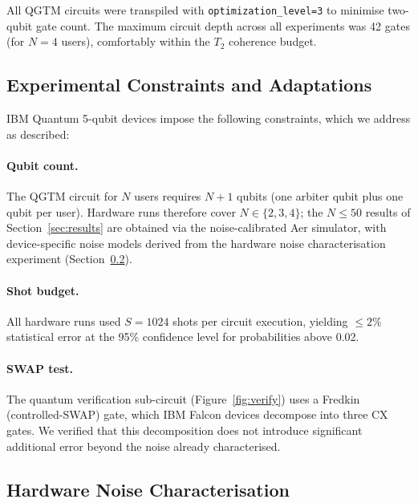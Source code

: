 \noindent All QGTM circuits were transpiled with \texttt{optimization\_level=3} to
minimise two-qubit gate count. The maximum circuit depth across all experiments
was 42 gates (for $N=4$ users), comfortably within the $T_2$ coherence budget.

\subsection{Experimental Constraints and Adaptations}
\label{subsec:hw_constraints}

IBM Quantum 5-qubit devices impose the following constraints, which we address
as described:

\paragraph{Qubit count.}
The QGTM circuit for $N$ users requires $N+1$ qubits (one arbiter qubit plus
one qubit per user). Hardware runs therefore cover $N \in \{2, 3, 4\}$; the
$N \leq 50$ results of Section~\ref{sec:results} are obtained via the
noise-calibrated Aer simulator, with device-specific noise models derived from
the hardware noise characterisation experiment (Section~\ref{subsec:hw_noise}).

\paragraph{Shot budget.}
All hardware runs used $S = 1024$ shots per circuit execution, yielding
$\le 2\%$ statistical error at the 95\% confidence level for probabilities
above 0.02.

\paragraph{SWAP test.}
The quantum verification sub-circuit (Figure~\ref{fig:verify}) uses a
Fredkin (controlled-SWAP) gate, which IBM Falcon devices decompose into
three CX gates. We verified that this decomposition does not introduce
significant additional error beyond the noise already characterised.

\subsection{Hardware Noise Characterisation}
\label{subsec:hw_noise}

